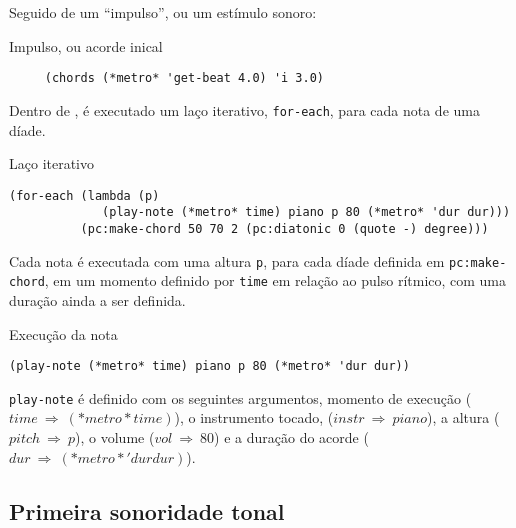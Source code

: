 Seguido de um ``impulso'', ou um estímulo sonoro:

\begin{example}{Impulso, ou acorde inical}
\begin{verbatim}
     (chords (*metro* 'get-beat 4.0) 'i 3.0)
\end{verbatim}
\end{example}

Dentro de , é executado um laço iterativo, \verb|for-each|, para cada nota de uma díade.

\begin{example}{Laço iterativo}\label{sec:iterativo}
\begin{verbatim}
(for-each (lambda (p)
             (play-note (*metro* time) piano p 80 (*metro* 'dur dur)))                                 
          (pc:make-chord 50 70 2 (pc:diatonic 0 (quote -) degree)))
\end{verbatim}
\end{example}

Cada nota é executada com uma altura \verb|p|, para cada díade definida em \verb|pc:make-chord|, em um momento definido por \verb|time| em relação ao pulso rítmico, com uma duração ainda a ser definida. 

\begin{example}{Execução da nota}
\begin{verbatim}
(play-note (*metro* time) piano p 80 (*metro* 'dur dur))
\end{verbatim}
\end{example}

\verb|play-note| é definido com os seguintes argumentos, momento de execução ($time~\Rightarrow~(*metro* time)$), o instrumento tocado, ($instr~\Rightarrow~piano$), a altura ($pitch~\Rightarrow~p$), o volume ($vol~\Rightarrow~80$) e a duração do acorde ($dur~\Rightarrow~(*metro* 'dur dur)$). 

\subsection{Primeira sonoridade tonal}\label{sec:1aSonoridade}

